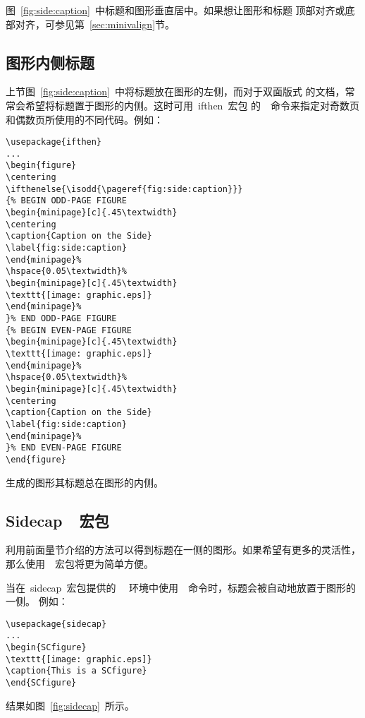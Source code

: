 图~\ref{fig:side:caption}~中标题和图形垂直居中。如果想让图形和标题
顶部对齐或底部对齐，可参见第~\ref{sec:minivalign}节。

\subsection{图形内侧标题}\label{ssec:bindcaption}

上节图~\ref{fig:side:caption}~中将标题放在图形的左侧，而对于双面版式
的文档，常常会希望将标题置于图形的内侧。这时可用~\textsf{ifthen}~宏包
的~~命令来指定对奇数页和偶数页所使用的不同代码。例如：
\begin{Verbatim}[xleftmargin=1cm]
\usepackage{ifthen} 
... 
\begin{figure} 
\centering 
\ifthenelse{\isodd{\pageref{fig:side:caption}}} 
{% BEGIN ODD-PAGE FIGURE 
\begin{minipage}[c]{.45\textwidth} 
\centering 
\caption{Caption on the Side} 
\label{fig:side:caption} 
\end{minipage}% 
\hspace{0.05\textwidth}% 
\begin{minipage}[c]{.45\textwidth} 
\texttt{[image: graphic.eps]} 
\end{minipage}% 
}% END ODD-PAGE FIGURE
{% BEGIN EVEN-PAGE FIGURE 
\begin{minipage}[c]{.45\textwidth} 
\texttt{[image: graphic.eps]} 
\end{minipage}% 
\hspace{0.05\textwidth}% 
\begin{minipage}[c]{.45\textwidth} 
\centering 
\caption{Caption on the Side} 
\label{fig:side:caption} 
\end{minipage}% 
}% END EVEN-PAGE FIGURE 
\end{figure}
\end{Verbatim}
生成的图形其标题总在图形的内侧。

\subsection{Sidecap~~宏包}\label{ssec:sidecap}

利用前面量节介绍的方法可以得到标题在一侧的图形。如果希望有更多的灵活性，
那么使用~~宏包将更为简单方便。

当在~\textsf{sidecap}~宏包提供的~~
环境中使用~~命令时，标题会被自动地放置于图形的一侧。
例如：
\begin{Verbatim}[xleftmargin=1cm]
\usepackage{sidecap} 
... 
\begin{SCfigure} 
\texttt{[image: graphic.eps]} 
\caption{This is a SCfigure} 
\end{SCfigure}
\end{Verbatim}
结果如图~\ref{fig:sidecap}~所示。

